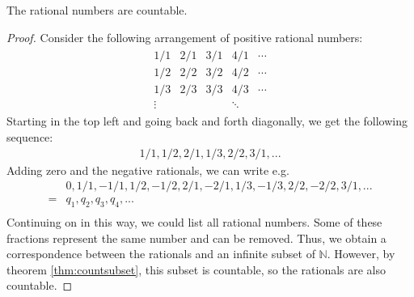 \begin{theorem}
  The rational numbers are countable.
\end{theorem}
\begin{proof}
  Consider the following arrangement of positive rational numbers:
  \begin{align*}
    \begin{array}{ccccc} 
      1/1 & 2/1 & 3/1 & 4/1 & \cdots \\
      1/2 & 2/2 & 3/2 & 4/2 & \cdots \\
      1/3 & 2/3 & 3/3 & 4/3 & \cdots \\
      \vdots &  &  & \ddots 
    \end{array}
  \end{align*}
  Starting in the top left and going back and forth diagonally, we get
  the following sequence:
  \begin{align*}
    1/1, 1/2, 2/1, 1/3, 2/2, 3/1, ...
  \end{align*}
  Adding zero and the negative rationals, we can write e.g.\
  \begin{align*}
    & 0,1/1, -1/1, 1/2, -1/2, 2/1, -2/1, 1/3, -1/3, 2/2, -2/2, 3/1,
    ... \\
    = & q_1, q_2, q_3 , q_4, ... \\
  \end{align*}
  Continuing on in this way, we could list all rational numbers. Some
  of these fractions represent the same number and can be
  removed. Thus, we obtain a correspondence between the rationals and
  an infinite subset of $\mathbb{N}$. However, by theorem
  \ref{thm:countsubset}, this subset is countable, so the rationals
  are also countable.
\end{proof}

